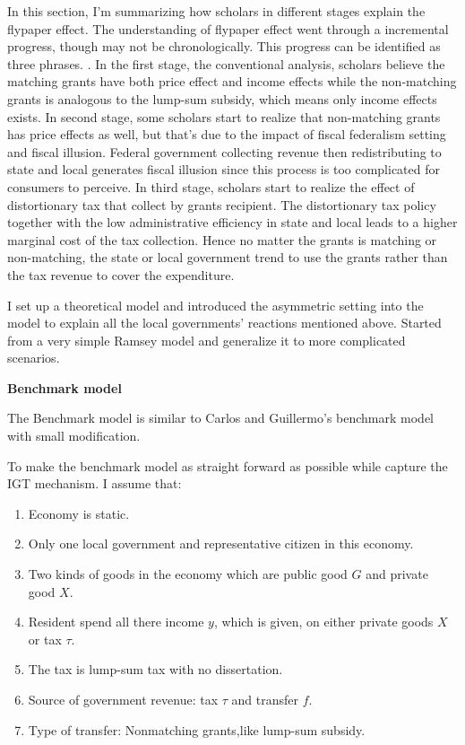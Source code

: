 In this section, I’m summarizing how scholars in different stages explain the flypaper effect. The understanding of flypaper effect went through a incremental progress, though may not be chronologically. This progress can be identified as three phrases. . In the first stage, the conventional analysis, scholars believe the matching grants have both price effect and income effects while the non-matching grants is analogous to the lump-sum subsidy, which means only income effects exists. In second stage, some scholars start to realize that non-matching grants has price effects as well, but that’s due to the impact of fiscal federalism setting and fiscal illusion. Federal government collecting revenue then redistributing to state and local generates fiscal illusion since this process is too complicated for consumers to perceive. In third stage, scholars start to realize the effect of distortionary tax that collect by grants recipient. The distortionary tax policy together with the low administrative efficiency in state and local leads to a higher marginal cost of the tax collection. Hence no matter the grants is matching or non-matching, the state or local government trend to use the grants rather than the tax revenue to cover the expenditure.

I set up a theoretical model and introduced the asymmetric setting into the model to explain all the local governments' reactions mentioned above. Started from a very simple Ramsey model and generalize it to more complicated scenarios.

\textbf{Benchmark model}

The Benchmark model is similar to Carlos and Guillermo's \cite{vegh2016unsticking} benchmark model with small modification.

To make the benchmark model as straight forward as possible while capture the IGT mechanism. I assume that:

\begin{enumerate}
    \item Economy is static.
    \item Only one local government and representative citizen in this economy.
    \item Two kinds of goods in the economy which are public good $G$ \label{G} and private good $X$.\label{X}
    \item Resident spend all there income $y$, which is given, on either private goods $X$ or tax $\tau$.\label{y}
    \item The tax is lump-sum tax with no dissertation.
    \item Source of government revenue: tax $\tau$ and transfer $f$.\label{f}
    \item Type of transfer: Nonmatching grants,like lump-sum subsidy.
\end{enumerate}

